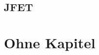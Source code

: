 \documentclass{article}
\begin{document}
\subsection{JFET }\label{k6:jfet}

\section{Ohne Kapitel}
\end{document}
